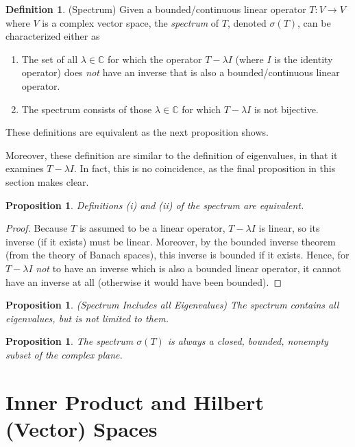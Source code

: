 \documentclass[12pt]{book}
\numberwithin{equation}{section} %
\theoremstyle{plain}
\newtheorem{prop}[thm]{Proposition}
\theoremstyle{definition}
\newtheorem{defn}[thm]{Definition}
\theoremstyle{remark}
\newcommand{\ra}{\rightarrow}
\newcommand{\C}{\mathbb{C}}
\begin{document}
\begin{defn}(Spectrum)
Given a bounded/continuous linear operator $T:V\ra V$ where $V$ is a
complex vector space, the \emph{spectrum} of $T$, denoted $\sigma(T)$,
can be characterized either as
\begin{enumerate}[label=(\roman*)]
  \item The set of all $\lambda\in \C$ for which the operator $T-\lambda I$
    (where $I$ is the identity operator) does \emph{not} have an
    inverse that is also a bounded/continuous linear operator.
  \item The spectrum consists of those $\lambda\in\C$ for which
    $T-\lambda I$ is not bijective.
\end{enumerate}
These definitions are equivalent as the next proposition shows.

Moreover, these definition are similar to the definition of eigenvalues,
in that it examines $T-\lambda I$.
In fact, this is no coincidence, as the final proposition in this
section makes clear.
\end{defn}

\begin{prop}
Definitions (i) and (ii) of the spectrum are equivalent.
\end{prop}
\begin{proof}
Because $T$ is assumed to be a linear operator, $T-\lambda I$ is linear,
so its inverse (if it exists) must be linear.
Moreover, by the bounded inverse theorem (from the theory of Banach
spaces), this inverse is bounded if it exists.
Hence, for $T-\lambda I$ \emph{not} to have an inverse which is also a
bounded linear operator, it cannot have an inverse at all (otherwise it
would have been bounded).
\end{proof}

\begin{prop}\emph{(Spectrum Includes all Eigenvalues)}
The spectrum contains all eigenvalues, but is not limited to them.
\end{prop}


\begin{prop}
The spectrum $\sigma(T)$ is always a closed, bounded, nonempty subset of
the complex plane.
\end{prop}


\clearpage
\section{Inner Product and Hilbert (Vector) Spaces}
\label{sec:banachhilbert}
\end{document}
